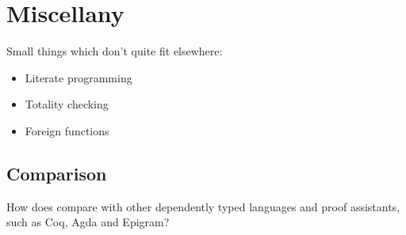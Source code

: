 \section{Miscellany}

Small things which don't quite fit elsewhere:

\begin{itemize}
\item Literate programming
\item Totality checking
\item Foreign functions
\end{itemize}

\subsection{Comparison}

How does \Idris{} compare with other dependently typed languages and proof
assistants, such as Coq, Agda and Epigram?
